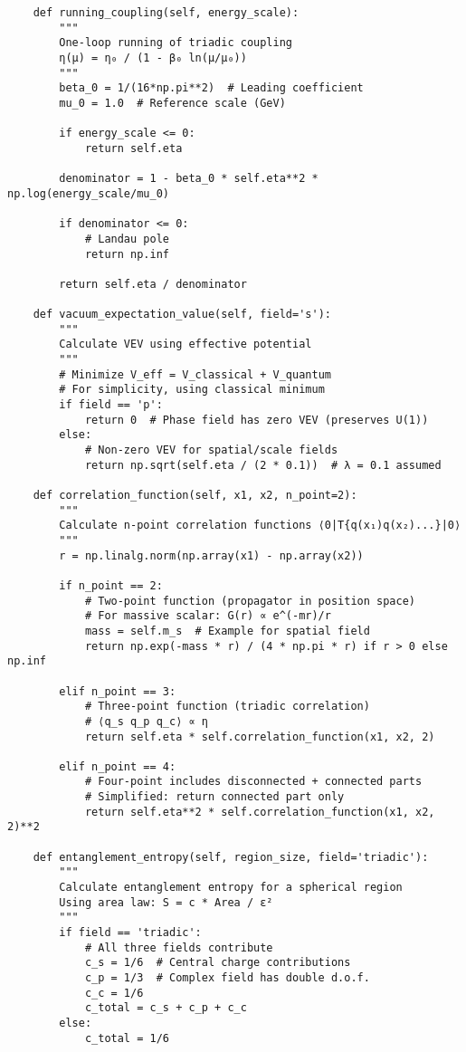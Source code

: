 \documentclass[openany]{memoir}
\theoremstyle{definition}
\theoremstyle{plain}
\theoremstyle{remark}
\begin{document}
\begin{lstlisting}
    def running_coupling(self, energy_scale):
        """
        One-loop running of triadic coupling
        η(μ) = η₀ / (1 - β₀ ln(μ/μ₀))
        """
        beta_0 = 1/(16*np.pi**2)  # Leading coefficient
        mu_0 = 1.0  # Reference scale (GeV)
        
        if energy_scale <= 0:
            return self.eta
            
        denominator = 1 - beta_0 * self.eta**2 * np.log(energy_scale/mu_0)
        
        if denominator <= 0:
            # Landau pole
            return np.inf
            
        return self.eta / denominator
    
    def vacuum_expectation_value(self, field='s'):
        """
        Calculate VEV using effective potential
        """
        # Minimize V_eff = V_classical + V_quantum
        # For simplicity, using classical minimum
        if field == 'p':
            return 0  # Phase field has zero VEV (preserves U(1))
        else:
            # Non-zero VEV for spatial/scale fields
            return np.sqrt(self.eta / (2 * 0.1))  # λ = 0.1 assumed
    
    def correlation_function(self, x1, x2, n_point=2):
        """
        Calculate n-point correlation functions ⟨0|T{q(x₁)q(x₂)...}|0⟩
        """
        r = np.linalg.norm(np.array(x1) - np.array(x2))
        
        if n_point == 2:
            # Two-point function (propagator in position space)
            # For massive scalar: G(r) ∝ e^(-mr)/r
            mass = self.m_s  # Example for spatial field
            return np.exp(-mass * r) / (4 * np.pi * r) if r > 0 else np.inf
            
        elif n_point == 3:
            # Three-point function (triadic correlation)
            # ⟨q_s q_p q_c⟩ ∝ η
            return self.eta * self.correlation_function(x1, x2, 2)
            
        elif n_point == 4:
            # Four-point includes disconnected + connected parts
            # Simplified: return connected part only
            return self.eta**2 * self.correlation_function(x1, x2, 2)**2
            
    def entanglement_entropy(self, region_size, field='triadic'):
        """
        Calculate entanglement entropy for a spherical region
        Using area law: S = c * Area / ε²
        """
        if field == 'triadic':
            # All three fields contribute
            c_s = 1/6  # Central charge contributions
            c_p = 1/3  # Complex field has double d.o.f.
            c_c = 1/6
            c_total = c_s + c_p + c_c
        else:
            c_total = 1/6
            

\end{lstlisting}
\end{document}
